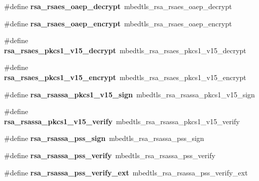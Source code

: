 \begin{DoxyCompactItemize}
\mbox{\label{compat-1_83_8h_a284331182cd96ce92212946104894a89}} 
\#define {\bfseries rsa\+\_\+rsaes\+\_\+oaep\+\_\+decrypt}~mbedtls\+\_\+rsa\+\_\+rsaes\+\_\+oaep\+\_\+decrypt
\item 
\mbox{\label{compat-1_83_8h_a31f5fef152b86b6ef76df14887302305}} 
\#define {\bfseries rsa\+\_\+rsaes\+\_\+oaep\+\_\+encrypt}~mbedtls\+\_\+rsa\+\_\+rsaes\+\_\+oaep\+\_\+encrypt
\item 
\mbox{\label{compat-1_83_8h_a15becf817b180ae07d9ed5a567c0f8a6}} 
\#define {\bfseries rsa\+\_\+rsaes\+\_\+pkcs1\+\_\+v15\+\_\+decrypt}~mbedtls\+\_\+rsa\+\_\+rsaes\+\_\+pkcs1\+\_\+v15\+\_\+decrypt
\item 
\mbox{\label{compat-1_83_8h_a04571ed789db2f0bacf367937bbd1d64}} 
\#define {\bfseries rsa\+\_\+rsaes\+\_\+pkcs1\+\_\+v15\+\_\+encrypt}~mbedtls\+\_\+rsa\+\_\+rsaes\+\_\+pkcs1\+\_\+v15\+\_\+encrypt
\item 
\mbox{\label{compat-1_83_8h_aed845db7cb7b7929829922a8d54920f5}} 
\#define {\bfseries rsa\+\_\+rsassa\+\_\+pkcs1\+\_\+v15\+\_\+sign}~mbedtls\+\_\+rsa\+\_\+rsassa\+\_\+pkcs1\+\_\+v15\+\_\+sign
\item 
\mbox{\label{compat-1_83_8h_ac2c73232441b5a16a589768eb319ca7c}} 
\#define {\bfseries rsa\+\_\+rsassa\+\_\+pkcs1\+\_\+v15\+\_\+verify}~mbedtls\+\_\+rsa\+\_\+rsassa\+\_\+pkcs1\+\_\+v15\+\_\+verify
\item 
\mbox{\label{compat-1_83_8h_a3cb38b10df94be4e06900c7f439ebf09}} 
\#define {\bfseries rsa\+\_\+rsassa\+\_\+pss\+\_\+sign}~mbedtls\+\_\+rsa\+\_\+rsassa\+\_\+pss\+\_\+sign
\item 
\mbox{\label{compat-1_83_8h_a055e3d8b629d5576616fb9aa80d7050b}} 
\#define {\bfseries rsa\+\_\+rsassa\+\_\+pss\+\_\+verify}~mbedtls\+\_\+rsa\+\_\+rsassa\+\_\+pss\+\_\+verify
\item 
\mbox{\label{compat-1_83_8h_ac7ab628877174c66dd5ea9d2e1b40486}} 
\#define {\bfseries rsa\+\_\+rsassa\+\_\+pss\+\_\+verify\+\_\+ext}~mbedtls\+\_\+rsa\+\_\+rsassa\+\_\+pss\+\_\+verify\+\_\+ext
\item 

\end{DoxyCompactItemize}
